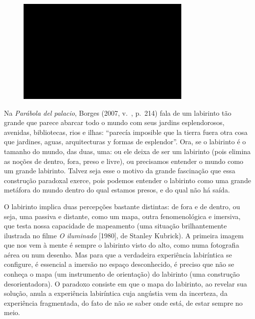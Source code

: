 \begin{figure}[!ht]
\centering
 \includegraphics[width=85mm]{./imgs/im1.jpg}
\caption{\tiny{}}
\end{figure}

Na \emph{Parábola del palacio}, Borges (2007, v.~, p.~214) fala de um
labirinto tão grande que parece abarcar todo o mundo com seus jardins
esplendorosos, avenidas, bibliotecas, rios e ilhas: ``parecía imposible
que la tierra fuera otra cosa que jardines, aguas, arquitecturas y
formas de esplendor''. Ora, se o labirinto é o tamanho do mundo, das
duas, uma: ou ele deixa de ser um labirinto (pois elimina as noções de
dentro, fora, preso e livre), ou precisamos entender o mundo como um
grande labirinto. Talvez seja esse o motivo da grande fascinação que
essa construção paradoxal exerce, pois podemos entender o labirinto como
uma grande metáfora do mundo dentro do qual estamos presos, e do qual
não há saída.

O labirinto implica duas percepções bastante distintas: de fora e de
dentro, ou seja, uma passiva e distante, como um mapa, outra
fenomenológica e imersiva, que testa nossa capacidade de mapeamento (uma
situação brilhantemente ilustrada no filme \emph{O iluminado} [1980], de
Stanley Kubrick). A primeira imagem que nos vem à mente é sempre o
labirinto visto do alto, como numa fotografia aérea ou num desenho. Mas
para que a verdadeira experiência labiríntica se configure, é essencial
a imersão no espaço desconhecido, é preciso que não se conheça o mapa
(um instrumento de orientação) do labirinto (uma construção
desorientadora). O paradoxo consiste em que o mapa do labirinto, ao
revelar sua solução, anula a experiência labiríntica cuja angústia vem
da incerteza, da experiência fragmentada, do fato de não se saber onde
está, de estar sempre no meio.

